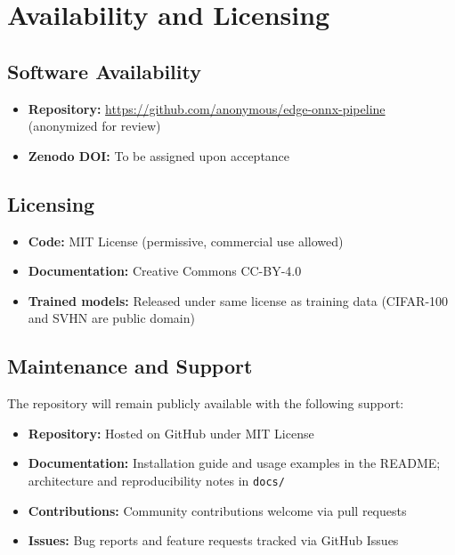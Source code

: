 \documentclass[review]{elsarticle}
\begin{document}
\section{Availability and Licensing}
\label{sec:availability}

\subsection{Software Availability}

\begin{itemize}
\item \textbf{Repository:} \url{https://github.com/anonymous/edge-onnx-pipeline} (anonymized for review)
\item \textbf{Zenodo DOI:} To be assigned upon acceptance
\end{itemize}

\subsection{Licensing}

\begin{itemize}
\item \textbf{Code:} MIT License (permissive, commercial use allowed)
\item \textbf{Documentation:} Creative Commons CC-BY-4.0
\item \textbf{Trained models:} Released under same license as training data (CIFAR-100 and SVHN are public domain)
\end{itemize}

\subsection{Maintenance and Support}

The repository will remain publicly available with the following support:

\begin{itemize}
\item \textbf{Repository:} Hosted on GitHub under MIT License
\item \textbf{Documentation:} Installation guide and usage examples in the README; architecture and reproducibility notes in \texttt{docs/}
\item \textbf{Contributions:} Community contributions welcome via pull requests
\item \textbf{Issues:} Bug reports and feature requests tracked via GitHub Issues
\end{itemize}
\end{document}
